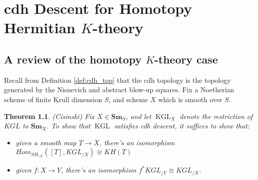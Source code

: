 \documentclass[edeposit,fullpage]{uiucthesis2009}
\newcommand{\mbb}{\mathbb}
\newcommand{\Sm}[1]{\mathbf{Sm}_{#1}}
\DeclareMathOperator{\iHom}{\mathbf{Hom}}
\DeclareMathOperator{\KGL}{KGL}
\theoremstyle{plain}
\numberwithin{lemma}{section}
\newtheorem{theorem}[lemma]{Theorem}
\theoremstyle{definition}
\begin{document}



\chapter{cdh Descent for Homotopy Hermitian $K$-theory}\label{chap:cdh}

\section{A review of the homotopy $K$-theory case}

Recall from Definition \ref{def:cdh_top} that the cdh topology is the
topology generated by the Nisnevich and abstract blow-up squares. Fix
a Noetherian scheme of finite Krull dimension $S$, and scheme $X$
which is smooth over $S$.

\begin{theorem}(Cisinski)
Fix $X \in \Sm{S}$, and let $\KGL_X$ denote the restriction of $KGL$
to $\Sm{X}$. To show that $\KGL$ satisfies cdh descent, it suffices to
show that:
\begin{itemize}
\item given a smooth map $T \rightarrow X$, there's an isomorphism
  $Hom_{SH_{/X}}([T], KGL_{/X}) \cong KH(T)$
\item given $f : X \rightarrow Y$, there's an isomorphism $f^* KGL_{/Y} \cong KGL_{/X}$.
\end{itemize}
\end{theorem}
\end{document}
